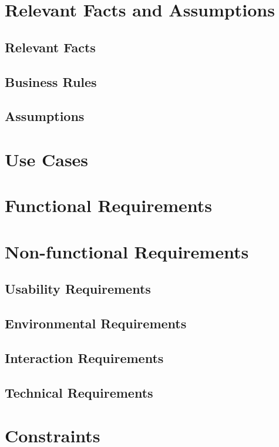 \documentclass[12pt,a4paper]{article}
\begin{document}
\section{Relevant Facts and Assumptions}
\subsection{Relevant Facts}
\subsection{Business Rules}
\subsection{Assumptions}


\pagebreak
\section{Use Cases}
\pagebreak
\section{Functional Requirements}
\pagebreak
\section{Non-functional Requirements}
\subsection{Usability Requirements}
\subsection{Environmental Requirements}
\subsection{Interaction Requirements}
\subsection{Technical Requirements}
\pagebreak
\section{Constraints}
\end{document}
